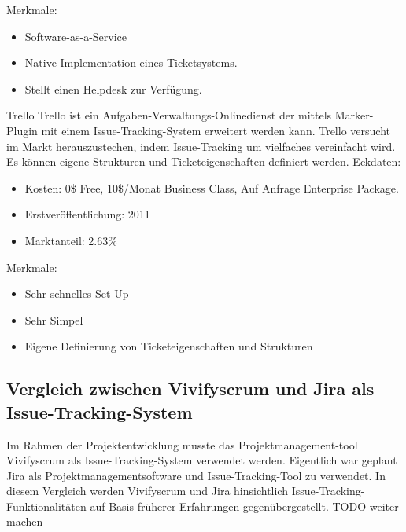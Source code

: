 Merkmale:
\begin{itemize}
	\item Software-as-a-Service
	\item Native Implementation eines Ticketsystems.
	\item Stellt einen Helpdesk zur Verfügung.
\end{itemize}
Trello
Trello ist ein Aufgaben-Verwaltungs-Onlinedienst der mittels Marker-Plugin mit einem Issue-Tracking-System erweitert werden kann. Trello versucht im Markt herauszustechen, indem Issue-Tracking um vielfaches vereinfacht wird. Es können eigene Strukturen und Ticketeigenschaften definiert werden. 
Eckdaten:
\begin{itemize}
	\item Kosten: 0\$ Free, 10\$/Monat Business Class, Auf Anfrage Enterprise Package.
	\item Erstveröffentlichung: 2011
	\item Marktanteil: 2.63\%
\end{itemize}		
Merkmale:
\begin{itemize}
	\item Sehr schnelles Set-Up
	\item Sehr Simpel
	\item Eigene Definierung von Ticketeigenschaften und Strukturen
\end{itemize}			
\subsection{Vergleich zwischen Vivifyscrum und Jira als Issue-Tracking-System}				
Im Rahmen der Projektentwicklung musste das Projektmanagement-tool Vivifyscrum als Issue-Tracking-System verwendet werden. Eigentlich war geplant Jira als Projektmanagementsoftware und Issue-Tracking-Tool zu verwendet. In diesem Vergleich werden Vivifyscrum und Jira hinsichtlich Issue-Tracking-Funktionalitäten auf Basis früherer Erfahrungen gegenübergestellt. 
TODO weiter machen
